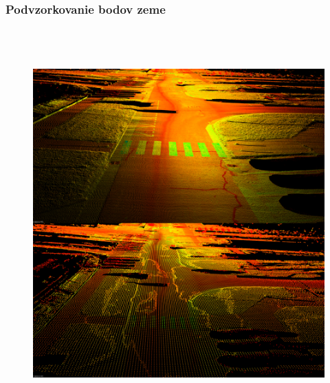 \subsubsection{Podvzorkovanie bodov zeme}
\noindent 

\begin{figure}[!htbp]
  \centering
  \includegraphics[width=15cm, height=15cm]{img/downsample_ground.png}
  \caption{} 
  \label{fig:downsample_ground}
\end{figure} 

